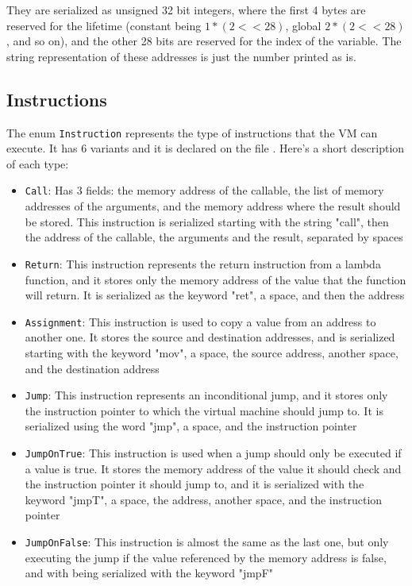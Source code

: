 \documentclass[11pt]{scrreprt}
\begin{document}
They are serialized as unsigned 32 bit integers, where the first 4 bytes are reserved for the lifetime (constant being $1 * (2 << 28)$, global $2 * (2 << 28)$, and so on), and the other 28 bits are reserved for the index of the variable. The string representation of these addresses is just the number printed as is.

\subsection{Instructions}
The enum \texttt{Instruction} represents the type of instructions that the VM can execute. It has 6 variants and it is declared on the file . Here's a short description of each type:
\begin{itemize}
  \item \texttt{Call}: Has 3 fields: the memory address of the callable, the list of memory addresses of the arguments, and the memory address where the result should be stored. This instruction is serialized starting with the string "call", then the address of the callable, the arguments and the result, separated by spaces
  \item \texttt{Return}: This instruction represents the return instruction from a lambda function, and it stores only the memory address of the value that the function will return. It is serialized as the keyword "ret", a space, and then the address
  \item \texttt{Assignment}: This instruction is used to copy a value from an address to another one. It stores the source and destination addresses, and is serialized starting with the keyword "mov", a space, the source address, another space, and the destination address
  \item \texttt{Jump}: This instruction represents an inconditional jump, and it stores only the instruction pointer to which the virtual machine should jump to. It is serialized using the word "jmp", a space, and the instruction pointer
  \item \texttt{JumpOnTrue}: This instruction is used when a jump should only be executed if a value is true. It stores the memory address of the value it should check and the instruction pointer it should jump to, and it is serialized with the keyword "jmpT", a space, the address, another space, and the instruction pointer
  \item \texttt{JumpOnFalse}: This instruction is almost the same as the last one, but only executing the jump if the value referenced by the memory address is false, and with being serialized with the keyword "jmpF"
\end{itemize}
\end{document}
